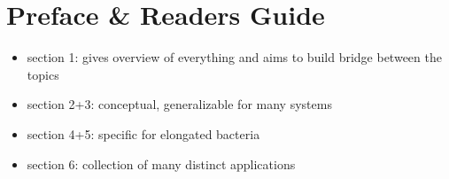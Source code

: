 



\pagestyle{fancy}
\renewcommand{\sectionmark}[1]{\markright{\thesection~ ~#1}}




\newpage
{}
\tableofcontents
\newpage

\listoffigures

\listoftables

\lstlistoflistings



\chapter*{Preface \& Readers Guide}
\begin{itemize}
    \item section 1: gives overview of everything and aims to build bridge between the topics
    \item section 2+3: conceptual, generalizable for many systems
    \item section 4+5: specific for elongated bacteria
    \item section 6: collection of many distinct applications
\end{itemize}

\pagebreak










\newpage
\printbibliography
{}



\newpage
\thispagestyle{empty}
\listoftodos
{}




